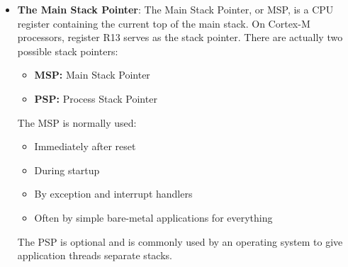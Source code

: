 \documentclass{report}
\begin{document}
\begin{itemize}
\begin{ccode}
            0x08020000  Application vector table
                Application code
            \end{ccode}
            \bigbreak \noindent 
            At reset, the processor uses the bootloader’s vector table because it is at the boot address. When the bootloader wants to run the application, it reads the application’s first two vector entries:
            \bigbreak \noindent 
            \begin{ccode}
                uint32_t app_msp   = *(uint32_t *)0x08020000;
                uint32_t app_reset = *(uint32_t *)0x08020004;
            \end{ccode}
            \bigbreak \noindent 
            It then approximately performs:
            \bigbreak \noindent 
            \begin{ccode}
                SCB->VTOR = 0x08020000;  // Use application's vector table
                __set_MSP(app_msp);      // Use application's stack
                jump_to(app_reset);      // Run application's Reset_Handler
            \end{ccode}
            \bigbreak \noindent 
            Therefore, multiple firmware images can coexist, but only one vector table is active for interrupt dispatch at a time.
        \item \textbf{The Main Stack Pointer}: The Main Stack Pointer, or MSP, is a CPU register containing the current top of the main stack.
            \bigbreak \noindent 
            On Cortex-M processors, register R13 serves as the stack pointer. There are actually two possible stack pointers:
            \begin{itemize}
                \item \textbf{MSP:} Main Stack Pointer
                \item \textbf{PSP:} Process Stack Pointer
            \end{itemize}
            The MSP is normally used:
            \begin{itemize}
                \item Immediately after reset
                \item During startup
                \item By exception and interrupt handlers
                \item Often by simple bare-metal applications for everything
            \end{itemize}
            The PSP is optional and is commonly used by an operating system to give application threads separate stacks.

\end{itemize}
\end{document}
